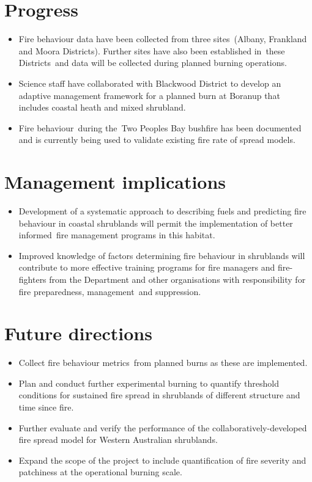 \documentclass[version=last,
    paper=a4, %
    10pt, %
    usenames,
    dvipsnames,
    oneside, %
    headings=openany, %
    DIV=15 %
]{scrbook}
\begin{document}
\section*{Progress}
\begin{itemize}
\itemsep1pt\parskip0pt
\item
  Fire behaviour data have been collected from three sites~(Albany,
  Frankland and Moora Districts). Further sites have also been
  established in~these Districts~and data will be collected during
  planned burning operations.
\item
  Science staff have collaborated with Blackwood District to develop an
  adaptive management framework for a planned burn at Boranup that
  includes coastal heath and mixed shrubland.
\item
  Fire behaviour~during the~Two Peoples Bay bushfire has been documented
  and is currently being used to validate existing fire rate of spread
  models.
\end{itemize}



\section*{Management implications}
\begin{itemize}
\itemsep1pt\parskip0pt
\item
  Development of a systematic approach to describing fuels and
  predicting fire behaviour in coastal shrublands will permit the
  implementation of better informed~fire management programs in this
  habitat.
\item
  Improved knowledge of factors determining fire behaviour in shrublands
  will contribute to more effective training programs for fire managers
  and fire-fighters from the Department and other organisations with
  responsibility for fire preparedness, management~and suppression.
\end{itemize}



\section*{Future directions}
\begin{itemize}
\itemsep1pt\parskip0pt
\item
  Collect fire behaviour metrics~from planned burns as these are
  implemented.
\item
  Plan and conduct further experimental burning to quantify threshold
  conditions for sustained fire spread in shrublands of different
  structure and time since fire.
\item
  Further evaluate and verify the performance of the
  collaboratively-developed fire spread model for Western Australian
  shrublands.
\item
  Expand the scope of the project to include quantification of fire
  severity and patchiness at the operational burning scale.
\end{itemize}



\end{document}
